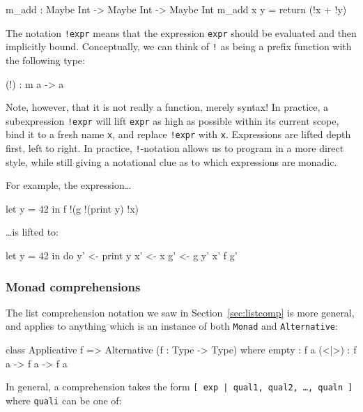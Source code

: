 \begin{code}
m_add : Maybe Int -> Maybe Int -> Maybe Int
m_add x y = return (!x + !y)
\end{code}

\noindent
The notation \texttt{!expr} means that the expression \texttt{expr} should
be evaluated and then implicitly bound. Conceptually,
we can think of \texttt{!} as being a prefix function with the following type:

\begin{code}
(!) : m a -> a
\end{code}

\noindent
Note, however, that it is not really a function, merely syntax! In practice,
a subexpression \texttt{!expr} will lift \texttt{expr} as high as possible within
its current scope, bind it to a fresh name \texttt{x}, and replace \texttt{!expr}
with \texttt{x}. Expressions are lifted depth first, left to right. In
practice, \texttt{!}-notation allows us to program in a more direct style,
while still giving a notational clue as to which expressions are monadic.

For example, the expression\ldots

\begin{code}
let y = 42 in f !(g !(print y) !x) 
\end{code}

\ldots is lifted to:

\begin{code}
let y = 42 in do y' <- print y
                 x' <- x
                 g' <- g y' x'
                 f g'
\end{code}

\subsubsection*{Monad comprehensions}

The list comprehension notation we saw in Section~\ref{sec:listcomp} is more
general, and applies to anything which is an instance of both \texttt{Monad}
and \texttt{Alternative}:

\begin{code}
class Applicative f => Alternative (f : Type -> Type) where
    empty : f a
    (<|>) : f a -> f a -> f a
\end{code}

\noindent
In general, a comprehension takes the form \texttt{[ exp | qual1, qual2,
\ldots, qualn ]} where \texttt{quali} can be one of:


